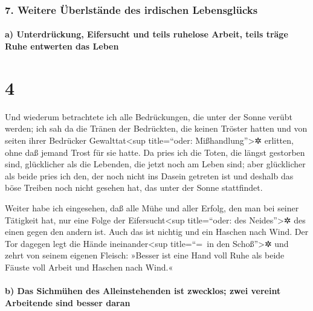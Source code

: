 \hypertarget{weitere-uxfcberlstuxe4nde-des-irdischen-lebensgluxfccks}{%
\subsubsection{7. Weitere Überlstände des irdischen
Lebensglücks}\label{weitere-uxfcberlstuxe4nde-des-irdischen-lebensgluxfccks}}

\hypertarget{a-unterdruxfcckung-eifersucht-und-teils-ruhelose-arbeit-teils-truxe4ge-ruhe-entwerten-das-leben}{%
\paragraph{a) Unterdrückung, Eifersucht und teils ruhelose Arbeit, teils
träge Ruhe entwerten das
Leben}\label{a-unterdruxfcckung-eifersucht-und-teils-ruhelose-arbeit-teils-truxe4ge-ruhe-entwerten-das-leben}}

\hypertarget{section-3}{%
\section{4}\label{section-3}}

Und wiederum betrachtete ich alle Bedrückungen, die unter
der Sonne verübt werden; ich sah da die Tränen der Bedrückten, die
keinen Tröster hatten und von seiten ihrer Bedrücker
Gewalttat\textless sup title=``oder: Mißhandlung''\textgreater✲
erlitten, ohne daß jemand Trost für sie hatte. Da pries
ich die Toten, die längst gestorben sind, glücklicher als die Lebenden,
die jetzt noch am Leben sind; aber glücklicher als beide
pries ich den, der noch nicht ins Dasein getreten ist und deshalb das
böse Treiben noch nicht gesehen hat, das unter der Sonne stattfindet.

Weiter habe ich eingesehen, daß alle Mühe und aller
Erfolg, den man bei seiner Tätigkeit hat, nur eine Folge der
Eifersucht\textless sup title=``oder: des Neides''\textgreater✲ des
einen gegen den andern ist. Auch das ist nichtig und ein Haschen nach
Wind. Der Tor dagegen legt die Hände
ineinander\textless sup title=``=~in den Schoß''\textgreater✲ und zehrt
von seinem eigenen Fleisch: »Besser ist eine Hand voll
Ruhe als beide Fäuste voll Arbeit und Haschen nach Wind.«

\hypertarget{b-das-sichmuxfchen-des-alleinstehenden-ist-zwecklos-zwei-vereint-arbeitende-sind-besser-daran}{%
\paragraph{b) Das Sichmühen des Alleinstehenden ist zwecklos; zwei
vereint Arbeitende sind besser
daran}\label{b-das-sichmuxfchen-des-alleinstehenden-ist-zwecklos-zwei-vereint-arbeitende-sind-besser-daran}}

